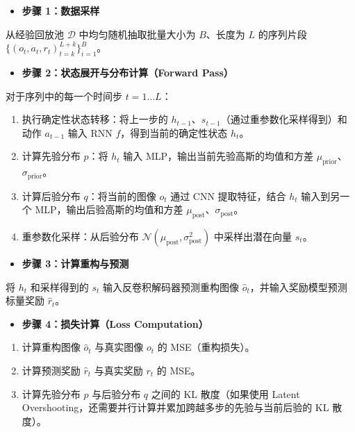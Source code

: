 \begin{itemize}
\tightlist
\item
  \textbf{步骤 1：数据采样}
\end{itemize}

从经验回放池 \(\mathcal{D}\) 中均匀随机抽取批量大小为 \(B\)、长度为 \(L\) 的序列片段 \(\{(o_t, a_t, r_t)_{t=k}^{L+k}\}_{i=1}^{B}\)。

\begin{itemize}
\tightlist
\item
  \textbf{步骤 2：状态展开与分布计算（Forward Pass）}
\end{itemize}

对于序列中的每一个时间步 \(t = 1 \ldots L\)：

\begin{enumerate}
\def\labelenumi{\arabic{enumi}.}
\tightlist
\item
  执行确定性状态转移：将上一步的 \(h_{t-1}\)、\(s_{t-1}\)（通过重参数化采样得到）和动作 \(a_{t-1}\) 输入 RNN \(f\)，得到当前的确定性状态 \(h_t\)。
\item
  计算先验分布 \(p\)：将 \(h_t\) 输入 MLP，输出当前先验高斯的均值和方差 \(\mu_{\mathrm{prior}}\)、\(\sigma_{\mathrm{prior}}\)。
\item
  计算后验分布 \(q\)：将当前的图像 \(o_t\) 通过 CNN 提取特征，结合 \(h_t\) 输入到另一个 MLP，输出后验高斯的均值和方差 \(\mu_{\mathrm{post}}\)、\(\sigma_{\mathrm{post}}\)。
\item
  重参数化采样：从后验分布 \(\mathcal{N}(\mu_{\mathrm{post}}, \sigma_{\mathrm{post}}^2)\) 中采样出潜在向量 \(s_t\)。
\end{enumerate}

\begin{itemize}
\tightlist
\item
  \textbf{步骤 3：计算重构与预测}
\end{itemize}

将 \(h_t\) 和采样得到的 \(s_t\) 输入反卷积解码器预测重构图像 \(\hat{o}_t\)，并输入奖励模型预测标量奖励 \(\hat{r}_t\)。

\begin{itemize}
\tightlist
\item
  \textbf{步骤 4：损失计算（Loss Computation）}
\end{itemize}

\begin{enumerate}
\def\labelenumi{\arabic{enumi}.}
\tightlist
\item
  计算重构图像 \(\hat{o}_t\) 与真实图像 \(o_t\) 的 MSE（重构损失）。
\item
  计算预测奖励 \(\hat{r}_t\) 与真实奖励 \(r_t\) 的 MSE。
\item
  计算先验分布 \(p\) 与后验分布 \(q\) 之间的 KL 散度（如果使用 Latent Overshooting，还需要并行计算并累加跨越多步的先验与当前后验的 KL 散度）。
\end{enumerate}

